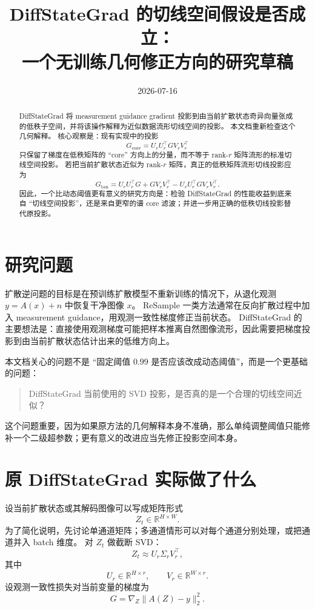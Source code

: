 \documentclass[11pt]{article}
\title{DiffStateGrad 的切线空间假设是否成立：\\
一个无训练几何修正方向的研究草稿}
\author{}
\date{2026-07-16}
\begin{document}
\maketitle

\begin{abstract}
DiffStateGrad 将 measurement guidance gradient 投影到由当前扩散状态奇异向量张成的低秩子空间，并将该操作解释为近似数据流形切线空间的投影。
本文档重新检查这个几何解释。
核心观察是：现有实现中的投影
\[
    G_{\mathrm{core}} = U_r U_r^\top G V_r V_r^\top
\]
只保留了梯度在低秩矩阵的 ``core'' 方向上的分量，而不等于 rank-$r$ 矩阵流形的标准切线空间投影。
若把当前扩散状态近似为 rank-$r$ 矩阵，真正的低秩矩阵流形切线投影应为
\[
    G_{\mathrm{tan}}
    = U_r U_r^\top G + G V_r V_r^\top
    - U_r U_r^\top G V_r V_r^\top .
\]
因此，一个比动态阈值更有意义的研究方向是：检验 DiffStateGrad 的性能收益到底来自 ``切线空间投影''，还是来自更窄的谱 core 滤波；并进一步用正确的低秩切线投影替代原投影。
\end{abstract}

\section{研究问题}

扩散逆问题的目标是在预训练扩散模型不重新训练的情况下，从退化观测 $y = A(x) + n$ 中恢复干净图像 $x$。
ReSample 一类方法通常在反向扩散过程中加入 measurement guidance，用观测一致性梯度修正当前状态。
DiffStateGrad 的主要想法是：直接使用观测梯度可能把样本推离自然图像流形，因此需要把梯度投影到由当前扩散状态估计出来的低维方向上。

本文档关心的问题不是 ``固定阈值 $0.99$ 是否应该改成动态阈值''，而是一个更基础的问题：
\begin{quote}
DiffStateGrad 当前使用的 SVD 投影，是否真的是一个合理的切线空间近似？
\end{quote}

这个问题重要，因为如果原方法的几何解释本身不准确，那么单纯调整阈值只能修补一个二级超参数；更有意义的改进应当先修正投影空间本身。

\section{原 DiffStateGrad 实际做了什么}

设当前扩散状态或其解码图像可以写成矩阵形式
\[
    Z_t \in \mathbb{R}^{H \times W}.
\]
为了简化说明，先讨论单通道矩阵；多通道情形可以对每个通道分别处理，或把通道并入 batch 维度。
对 $Z_t$ 做截断 SVD：
\[
    Z_t \approx U_r \Sigma_r V_r^\top ,
\]
其中
\[
    U_r \in \mathbb{R}^{H \times r}, \qquad
    V_r \in \mathbb{R}^{W \times r}.
\]
设观测一致性损失对当前变量的梯度为
\[
    G = \nabla_Z \|A(Z) - y\|_2^2 .
\]
\end{document}
